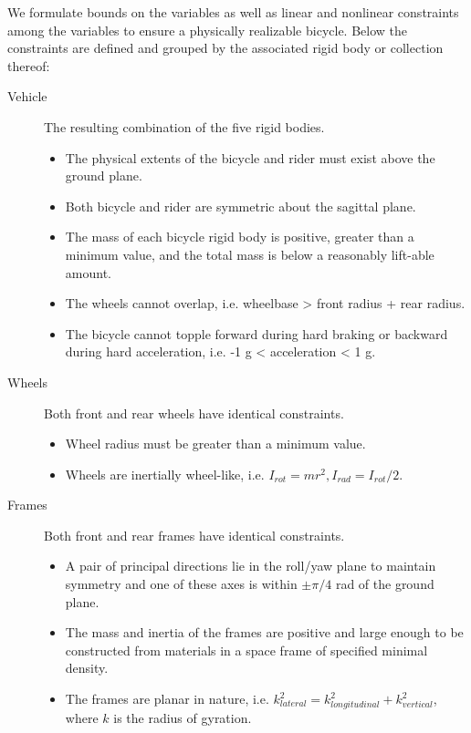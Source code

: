 \documentclass{bmd2019a}
\begin{document}
We formulate bounds on the variables as well as linear and nonlinear
constraints among the variables to ensure a physically realizable bicycle.
Below the constraints are defined and grouped by the associated rigid body or
collection thereof:
%
\begin{description}

  \item[Vehicle] The resulting combination of the five rigid bodies.
    \begin{itemize}
      \itemsep0em
      \item The physical extents of the bicycle and rider must exist above the
        ground plane.
      \item Both bicycle and rider are symmetric about the sagittal
        plane.
      \item The mass of each bicycle rigid body is positive, greater than a
        minimum value, and the total mass is below a reasonably lift-able
        amount.
      \item The wheels cannot overlap, i.e. wheelbase > front radius + rear
        radius.
      \item The bicycle cannot topple forward during hard braking or backward
        during hard acceleration, i.e. -1 g < acceleration < 1 g.
    \end{itemize}

  \item[Wheels] Both front and rear wheels have identical constraints.
    \begin{itemize}
      \itemsep0em
      \item Wheel radius must be greater than a minimum value.
      \item Wheels are inertially wheel-like, i.e.  $I_{rot}=mr^2,
        I_{rad}=I_{rot}/2$.
    \end{itemize}

  \item[Frames] Both front and rear frames have identical constraints.
    \begin{itemize}
      \itemsep0em
      \item A pair of principal directions lie in the roll/yaw
        plane to maintain symmetry and one of these axes is within $\pm \pi/4$
        rad of the ground plane.
      \item The mass and inertia of the frames are positive and large enough to
        be constructed from materials in a space frame of specified minimal
        density.
      \item The frames are planar in nature, i.e.
        $k_{lateral}^2=k_{longitudinal}^2+k_{vertical}^2$, where $k$ is the
        radius of gyration.
    \end{itemize}


\end{description}
\end{document}

